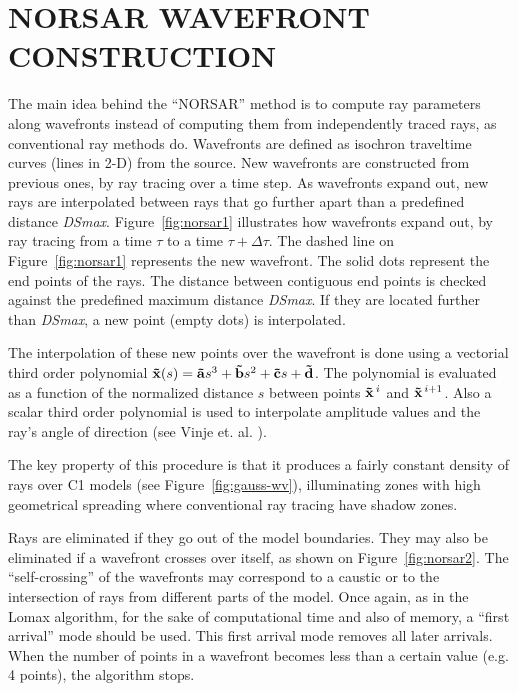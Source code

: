 \section{NORSAR WAVEFRONT CONSTRUCTION}

The main idea behind the ``NORSAR'' method 
is to compute ray parameters 
along wavefronts instead of computing them from independently traced
rays, as conventional ray methods do. Wavefronts are defined as
isochron traveltime curves (lines in \mbox{2-D}) from the source. 
New wavefronts are constructed from previous ones, by ray tracing over 
a time step. As wavefronts expand out, new rays are interpolated
between rays that go further apart than a predefined distance {\it DSmax\/}.
Figure~\ref{fig:norsar1} illustrates how wavefronts expand out, by ray 
tracing from a time $\tau$ to a time $\tau + \Delta \tau$. The
dashed line on Figure~\ref{fig:norsar1} represents the new
wavefront. The
solid dots represent the end points of the rays. The distance
between contiguous end points is checked against the predefined maximum
distance {\it DSmax\/}. If they are located further than 
{\it DSmax\/}, a new point (empty dots) is interpolated.

The interpolation of these
new points over the wavefront is done using a vectorial
third order polynomial
\( {\bf \vec{x}}(s) = {\bf \vec{a}} s^{3} + {\bf \vec{b}} s^{2} +
{\bf \vec{c}} s + {\bf \vec{d}} \).
The polynomial is evaluated as a function of the normalized
distance $s$ between points \( {\bf \vec{x}}^{\, i} \) and 
\( {\bf \vec{x}}^{\, i+1} \).
Also a scalar third order polynomial is used to interpolate amplitude values
and the ray's angle of direction (see Vinje et. al. ).

The key property of this procedure is that it
produces a fairly constant density of rays over C1 models
\cite{Vinje} (see Figure~\ref{fig:gauss-wv}), illuminating
zones with high geometrical spreading where conventional ray tracing
have shadow zones.


Rays are eliminated if they go out of the model boundaries.
They may also be eliminated if a wavefront crosses over itself, as shown on
Figure~\ref{fig:norsar2}. The ``self-crossing'' of the wavefronts may
correspond to a caustic or to the intersection of rays from 
different parts of the model. Once again, as in the Lomax algorithm,
for the sake of computational
time and also of memory, a ``first arrival'' mode should be used.
This first arrival mode removes all later arrivals.
When the number of points in a wavefront becomes less than a certain
value (e.g. 4 points), the algorithm stops.

